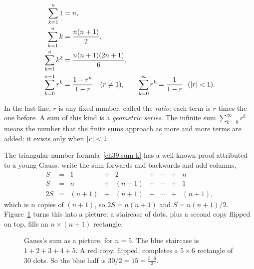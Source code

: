 \begin{formalbox}
\begin{align}
\sum_{k=1}^{n} 1 &= n, \label{ch39:sum-ones}\\
\sum_{k=1}^{n} k &= \frac{n(n+1)}{2}, \label{ch39:sum-k}\\
\sum_{k=1}^{n} k^2 &= \frac{n(n+1)(2n+1)}{6}, \label{ch39:sum-ksq}\\
\sum_{k=0}^{n-1} r^k &= \frac{1 - r^n}{1 - r}\quad (r \ne 1), \qquad
\sum_{k=0}^{\infty} r^k = \frac{1}{1-r}\ \ (\lvert r\rvert<1). \label{ch39:geometric}
\end{align}
\end{formalbox}

In the last line, $r$ is any fixed number, called the \emph{ratio}: each term is $r$ times the one
before. A sum of this kind is a \emph{geometric series}. The infinite sum $\sum_{k=0}^{\infty} r^k$
means the number that the finite sums approach as more and more terms are added; it exists only when
$\lvert r\rvert<1$.

The triangular-number formula~\eqref{ch39:sum-k} has a well-known proof attributed to a young
Gauss: write the sum forwards and backwards and add columns,
\[
\begin{array}{rcccccccc}
S &=& 1 &+& 2 &+& \cdots &+& n\\
S &=& n &+& (n{-}1) &+& \cdots &+& 1\\ \hline
2S &=& (n{+}1) &+& (n{+}1) &+& \cdots &+& (n{+}1),
\end{array}
\]
which is $n$ copies of $(n+1)$, so $2S = n(n+1)$ and $S = n(n+1)/2$. Figure~\ref{ch39:fig-gauss}
turns this into a picture: a staircase of dots, plus a second copy flipped on top, fills an
$n \times (n+1)$ rectangle.

\begin{figure}[H]
\centering
{}
\caption{Gauss's sum as a picture, for $n=5$. The blue staircase is $1+2+3+4+5$. A red copy,
flipped, completes a $5\times 6$ rectangle of $30$ dots. So the blue half is $30/2 = 15 =
\tfrac{5\cdot 6}{2}$.}
\label{ch39:fig-gauss}
\end{figure}

